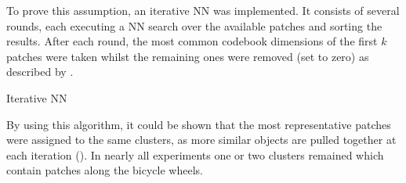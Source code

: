 To prove this assumption, an iterative \ac{NN} was implemented. It consists of several rounds, each executing a \ac{NN} search over the available patches and sorting the results. After each round, the most common codebook dimensions of the first $k$ patches were taken whilst the remaining ones were removed (set to zero) as described by .

\begin{algorithm}
	\caption{Iterative \ac{NN}}
	\label{alg:iterative_nn}
\end{algorithm}

By using this algorithm, it could be shown that the most representative patches were assigned to the same clusters, as more similar objects are pulled together at each iteration (). In nearly all experiments one or two clusters remained which contain patches along the bicycle wheels.



